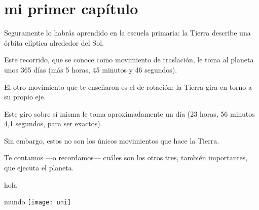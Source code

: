 \chapter{mi primer capítulo}

Seguramente lo habrás aprendido en la escuela primaria: la Tierra describe una órbita elíptica alrededor del Sol.

Este recorrido, que se conoce como movimiento de traslación, le toma al planeta unos 365 días
(más 5 horas, 45 minutos y 46 segundos).

El otro movimiento que te enseñaron es el de rotación: la Tierra gira en torno a su propio eje.

Este giro sobre sí misma le toma aproximadamente un día (23 horas, 56 minutos 4,1 segundos, para ser exactos).

Sin embargo, estos no son los únicos movimientos que hace la Tierra.

Te contamos —o recordamos— cuáles son los otros tres, también importantes, que ejecuta el planeta.

hola

mundo 
\texttt{[image: uni]}